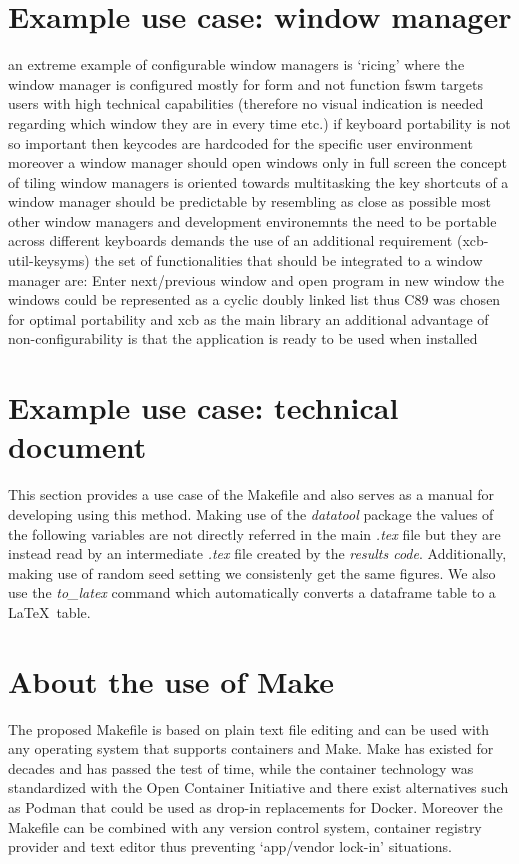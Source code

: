 \documentclass[journal]{IEEEtran}
\begin{document}
\section{Example use case: window manager}
an extreme example of configurable window managers is `ricing' where the window manager is configured mostly for form and not function
fswm targets users with high technical capabilities (therefore no visual indication is needed regarding which window they are in every time etc.)
if keyboard portability is not so important then keycodes are hardcoded for the specific user environment
moreover a window manager should open windows only in full screen
the concept of tiling window managers is oriented towards multitasking
the key shortcuts of a window manager should be predictable by resembling as close as possible most other window managers and development environemnts
the need to be portable across different keyboards demands the use of an additional requirement (xcb-util-keysyms)
the set of functionalities that should be integrated to a window manager are: Enter next/previous window and open program in new window
the windows could be represented as a cyclic doubly linked list
thus C89 was chosen for optimal portability and xcb as the main library
an additional advantage of non-configurability is that the application is ready to be used when installed

\section{Example use case: technical document}
This section provides a use case of the Makefile and also serves as a manual for developing using this method.
Making use of the \textit{datatool} package the values of the following variables are not directly referred in the main \textit{.tex} file but they are instead read by an intermediate \textit{.tex} file created by the \textit{results code}.
Additionally, making use of random seed setting we consistenly get the same figures.
We also use the \textit{to\_latex} command which automatically converts a dataframe table to a \LaTeX\ table.

\section{About the use of Make}
The proposed Makefile is based on plain text file editing and can be used with any operating system that supports containers and Make.
Make has existed for decades and has passed the test of time, while the container technology was standardized with the Open Container Initiative and there exist alternatives such as Podman that could be used as drop-in replacements for Docker.
Moreover the Makefile can be combined with any version control system, container registry provider and text editor thus preventing `app/vendor lock-in' situations.
\end{document}
